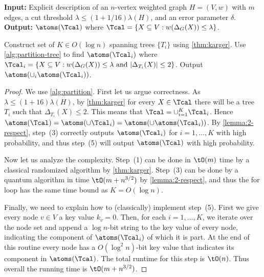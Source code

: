 \begin{algorithm}[H]
\caption{LearnCutAtoms$(H,\lambda,\delta)$}
\label{alg:partition}
 \hspace*{\algorithmicindent} \textbf{Input:} Explicit description of an $n$-vertex weighted graph $H = (V,w)$ with $m$ edges, a cut threshold $\lambda \le (1+1/16) \lambda(H)$, and an error parameter $\delta$. \\
 \hspace*{\algorithmicindent} \textbf{Output:} $\atoms(\Tcal)$ where $\Tcal = \{X \subseteq V: w(\Delta_G(X)) \le \lambda\}$.
\begin{algorithmic}[1]
\State
Construct set of $K \in O(\log n)$ spanning trees $\{T_i\}$ using \cref{thm:karger}.
\State
Use \cref{alg:partition-tree} to find $\atoms(\Tcal_i)$ where $\Tcal_i = \{X \subseteq V: w(\Delta_G(X)) \le \lambda \mbox{ and } |\Delta_{T_i}(X)| \le 2\}$.
\EndFor
\State
Output $\atoms(\cup_i \atoms(\Tcal_i))$.
\end{algorithmic}
\end{algorithm}

\cutatomsthm*

\begin{proof}
We use \cref{alg:partition}.  First let us argue correctness.  As $\lambda \le (1+16)\lambda(H)$, by \cref{thm:karger} for every $X \in \Tcal$ 
there will be a tree $T_i$ such that $\Delta_{T_i}(X) \le 2$.  This means that $\Tcal = \cup_{i=1}^K \Tcal_i$.  Hence 
$\atoms(\Tcal) = \atoms(\cup \Tcal_i) = \atoms(\cup \atoms(\Tcal_i))$.  By \cref{lemma:2-respect}, step~(3) correctly outputs $\atoms(\Tcal_i)$ 
for $i = 1, \ldots, K$ with high probability, and thus step~(5) will output $\atoms(\Tcal)$ with high probability.

Now let us analyze the complexity.  Step~(1) can be done in $\tO(m)$ time by a classical randomized algorithm by \cref{thm:karger}.  Step~(3) can 
be done by a quantum algorithm in time $\tO(m + n^{3/2})$ by \cref{lemma:2-respect}, and thus the for loop has the same time bound as $K = O(\log n)$.

Finally, we need to explain how to (classically) implement step~(5).  First we give every node $v \in V$ a key value $k_v = 0$.
Then, for each $i=1,\ldots, K$, we iterate over the node set and append a $\log n$-bit string to the key value of every node, indicating the component of $\atoms(\Tcal_i)$ of which it is part.
At the end of this routine every node has a $O(\log^2 n)$-bit key value that indicates its component in $\atoms(\Tcal)$.  The total runtime for this step is $\tO(n)$.  Thus overall 
the running time is $\tO(m + n^{3/2})$.
\end{proof}




